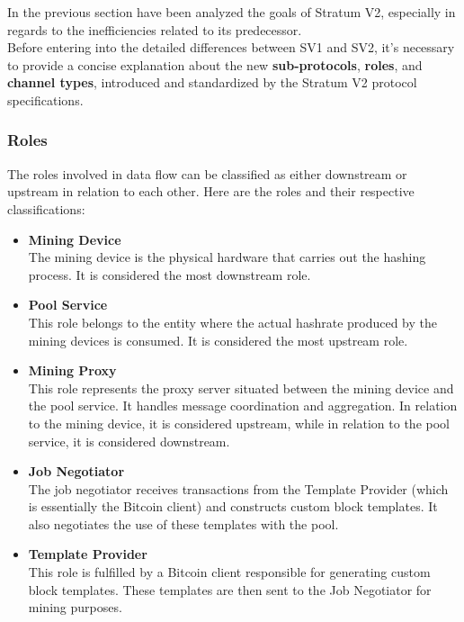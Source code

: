 In the previous section have been analyzed the goals of Stratum V2, especially in regards to the inefficiencies related to its predecessor. \\
Before entering into the detailed differences between SV1 and SV2, it's necessary to provide a concise explanation about the new \textbf{sub-protocols}, \textbf{roles}, and \textbf{channel types}, introduced and standardized by the Stratum V2 protocol specifications.\\
\subsubsection{Roles}
The roles involved in data flow can be classified as either downstream or upstream in relation to each other. Here are the roles and their respective classifications:
\begin{itemize}
    \item \textbf{Mining Device} \\ The mining device is the physical hardware that carries out the hashing process.
    It is considered the most downstream role.

    \item \textbf{Pool Service} \\ This role belongs to the entity where the actual hashrate produced by the mining devices is consumed. It is considered the most upstream role.

    \item \textbf{Mining Proxy} \\ This role represents the proxy server situated between the mining device and the pool service. It handles message coordination and aggregation. In relation to the mining device, it is considered upstream, while in relation to the pool service, it is considered downstream.

    \item \textbf{Job Negotiator} \\ The job negotiator receives transactions from the Template Provider (which is essentially the Bitcoin client) and constructs custom block templates. It also negotiates the use of these templates with the pool. 

    \item \textbf{Template Provider} \\ This role is fulfilled by a Bitcoin client responsible for generating custom block templates. These templates are then sent to the Job Negotiator for mining purposes.\\
\end{itemize}

